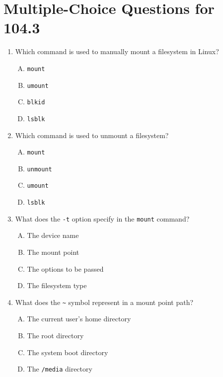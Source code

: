 \documentclass[a4paper]{report}
\begin{document}
\section*{Multiple-Choice Questions for 104.3}
\begin{enumerate}[1.]

    \item Which command is used to manually mount a filesystem in Linux?  
    \begin{enumerate}[A)]
        \item \texttt{mount}  
        \item \texttt{umount}  
        \item \texttt{blkid}  
        \item \texttt{lsblk}  
    \end{enumerate}

    \item Which command is used to unmount a filesystem?  
    \begin{enumerate}[A)]
        \item \texttt{mount}  
        \item \texttt{unmount}  
        \item \texttt{umount}  
        \item \texttt{lsblk}  
    \end{enumerate}

    \item What does the \texttt{-t} option specify in the \texttt{mount} command?  
    \begin{enumerate}[A)]
        \item The device name  
        \item The mount point  
        \item The options to be passed  
        \item The filesystem type  
    \end{enumerate}

    \item What does the \texttt{\textasciitilde} symbol represent in a mount point path?  
    \begin{enumerate}[A)]
        \item The current user's home directory  
        \item The root directory  
        \item The system boot directory  
        \item The \texttt{/media} directory  
    \end{enumerate}


\end{enumerate}
\end{document}
